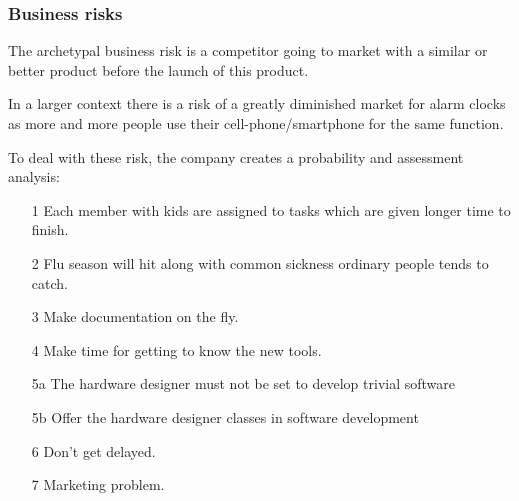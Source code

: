 \documentclass[Main]{subfiles}
\begin{document}
\subsubsection{Business risks} %
\label{sub:business_risks}

The archetypal business risk is a competitor going to market with a similar or better product before the launch of this product.

In a larger context there is a risk of a greatly diminished market for alarm clocks as more and more people use their cell-phone/smartphone for the same function.




To deal with these risk, the company creates a probability and assessment analysis:

\begin{itemize}
	\item[1] Each member with kids are assigned to tasks which are given longer time to finish.
	\item[2] Flu season will hit along with common sickness ordinary people tends to catch.
	\item[3] Make documentation on the fly.
	\item[4] Make time for getting to know the new tools.
	\item[5a] The hardware designer must not be set to develop trivial software
	\item[5b] Offer the hardware designer classes in software development
	\item[6] Don't get delayed.
	\item[7] Marketing problem.
\end{itemize}
\end{document}
